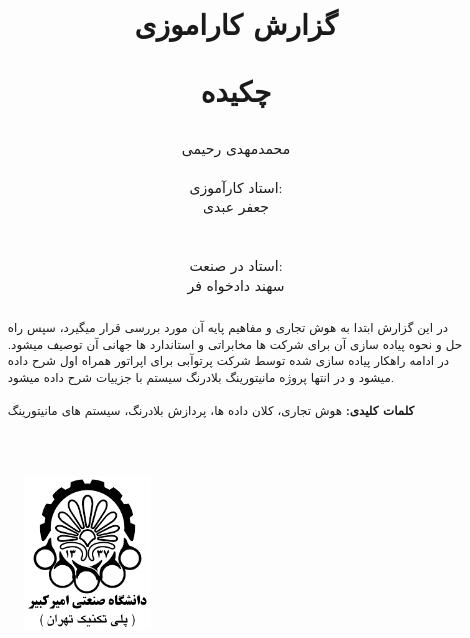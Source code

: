 \documentclass{llncs}
\begin{document}
\title{گزارش کاراموزی}
%
%

\author{محمدمهدی رحیمی \\  \\ استاد کارآموزی: \\ جعفر عبدی \\  \\ \\ استاد در صنعت: \\ سهند دادخواه فر}

\maketitle              %

\begin{figure}[h]
\centering
\includegraphics[width=0.3\textwidth]{mahi/AUT_logo.png}
\centering
\label{fig:aut}
\end{figure}
\newpage
\title{\begin{center}
\begin{normalsize}
\textbf{چکیده} 
\end{normalsize}
\end{center} }
\begin{abstract}
در این گزارش ابتدا به هوش تجاری و مفاهیم پایه آن مورد بررسی قرار میگیرد، سپس راه حل و نحوه پیاده سازی آن برای شرکت ها مخابراتی و استاندارد ها جهانی آن توصیف میشود.
در ادامه راهکار پیاده سازی شده توسط شرکت پرتوآبی برای اپراتور همراه اول شرح داده میشود و در انتها پروژه مانیتورینگ بلادرنگ سیستم با جزییات شرح داده میشود.
\\
\\
\textbf{کلمات کلیدی:} هوش تجاری، کلان داده ها، پردازش بلادرنگ، سیستم های مانیتورینگ

\end{abstract}
\newpage
%
\tableofcontents
\newpage
\listoffigures
\newpage
{}
\end{document}
